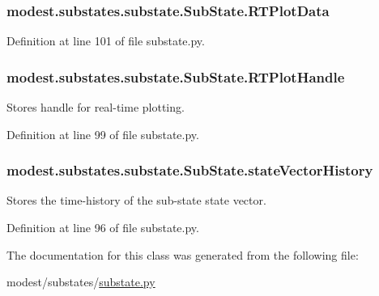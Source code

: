 \subsubsection[{\texorpdfstring{R\+T\+Plot\+Data}{RTPlotData}}]{\setlength{\rightskip}{0pt plus 5cm}modest.\+substates.\+substate.\+Sub\+State.\+R\+T\+Plot\+Data}\hypertarget{classmodest_1_1substates_1_1substate_1_1SubState_a9fefae1facc797a1132fb61a55e9ffa1}{}\label{classmodest_1_1substates_1_1substate_1_1SubState_a9fefae1facc797a1132fb61a55e9ffa1}


Definition at line 101 of file substate.\+py.

\subsubsection[{\texorpdfstring{R\+T\+Plot\+Handle}{RTPlotHandle}}]{\setlength{\rightskip}{0pt plus 5cm}modest.\+substates.\+substate.\+Sub\+State.\+R\+T\+Plot\+Handle}\hypertarget{classmodest_1_1substates_1_1substate_1_1SubState_a37ded775b84cea85b4dce0f1b16286c4}{}\label{classmodest_1_1substates_1_1substate_1_1SubState_a37ded775b84cea85b4dce0f1b16286c4}


Stores handle for real-\/time plotting. 



Definition at line 99 of file substate.\+py.

\subsubsection[{\texorpdfstring{state\+Vector\+History}{stateVectorHistory}}]{\setlength{\rightskip}{0pt plus 5cm}modest.\+substates.\+substate.\+Sub\+State.\+state\+Vector\+History}\hypertarget{classmodest_1_1substates_1_1substate_1_1SubState_a38c12c9d0899bc1161f3502b584517a2}{}\label{classmodest_1_1substates_1_1substate_1_1SubState_a38c12c9d0899bc1161f3502b584517a2}


Stores the time-\/history of the sub-\/state state vector. 



Definition at line 96 of file substate.\+py.



The documentation for this class was generated from the following file\+:\begin{DoxyCompactItemize}
\item 
modest/substates/\hyperlink{substate_8py}{substate.\+py}\end{DoxyCompactItemize}
